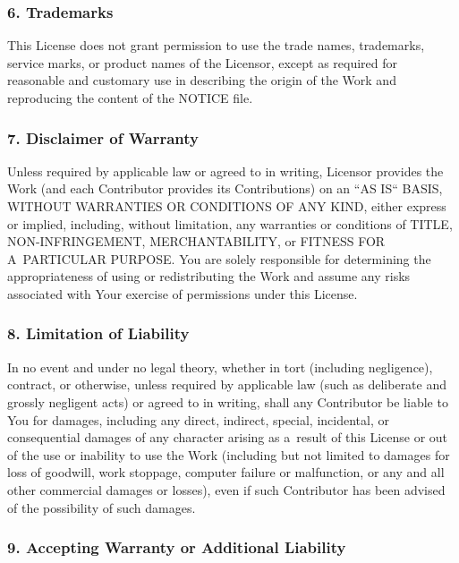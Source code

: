 \documentclass[a4paper, 11pt, twoside]{article}
\begin{document}
\subsubsection{6. Trademarks}

This License does not grant permission to use the trade names, trademarks, service marks, or product names of the Licensor, except as required for reasonable and customary use in describing the origin of the Work and reproducing the content of the NOTICE file.

\subsubsection{7. Disclaimer of Warranty}

Unless required by applicable law or agreed to in writing, Licensor provides the Work (and each Contributor provides its Contributions) on an “AS IS“ BASIS, WITHOUT WARRANTIES OR CONDITIONS OF ANY KIND, either express or implied, including, without limitation, any warranties or conditions of TITLE, NON-INFRINGEMENT, MERCHANTABILITY, or FITNESS FOR A~PARTICULAR PURPOSE. You are solely responsible for determining the appropriateness of using or redistributing the Work and assume any risks associated with Your exercise of permissions under this License.

\subsubsection{8. Limitation of Liability}

In no event and under no legal theory, whether in tort (including negligence), contract, or otherwise, unless required by applicable law (such as deliberate and grossly negligent acts) or agreed to in writing, shall any Contributor be liable to You for damages, including any direct, indirect, special, incidental, or consequential damages of any character arising as a~result of this License or out of the use or inability to use the Work (including but not limited to damages for loss of goodwill, work stoppage, computer failure or malfunction, or any and all other commercial damages or losses), even if such Contributor has been advised of the possibility of such damages.

\subsubsection{9. Accepting Warranty or Additional Liability}
\end{document}
